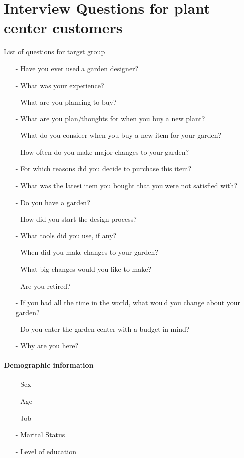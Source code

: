 \section{Interview Questions for plant center customers}\label{sec:interviewQuestionsCustomer}
List of questions for target group
\begin{itemize}
	\item[-] Have you ever used a garden designer?
	\item[-] What was your experience?
	\item[-] What are you planning to buy?
	\item[-] What are you plan/thoughts for when you buy a new plant?
	\item[-] What do you consider when you buy a new item for your garden?
	\item[-] How often do you make major changes to your garden?
	\item[-] For which reasons did you decide to purchase this item?
	\item[-] What was the latest item you bought that you were not satisfied with?
	\item[-] Do you have a garden?
	\item[-] How did you start the design process?
	\item[-] What tools did you use, if any?
	\item[-] When did you make changes to your garden?
	\item[-] What big changes would you like to make?
	\item[-] Are you retired?
	\item[-] If you had all the time in the world, what would you change about your garden?
	\item[-] Do you enter the garden center with a budget in mind?
	\item[-] Why are you here? \\
\end{itemize}

\paragraph*{Demographic information}
\begin{itemize}
	\item[-] Sex
	\item[-] Age
	\item[-] Job
	\item[-] Marital Status
	\item[-] Level of education
\end{itemize}


